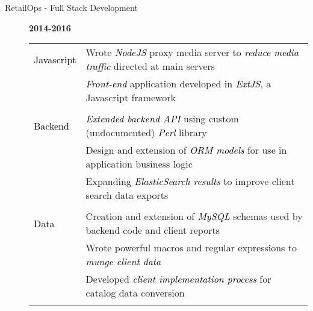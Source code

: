 \documentclass[12pt]{article}
\begin{document}
\begin{description}
\begin{description}
                \item[RetailOps - Full Stack Development] \hfill \textbf{2014-2016}\\
		\textcolor{gray}{
                    \begin{tabular}{l|l}
				\\[-1.0mm]
                        \textcolor{black}{Javascript} & Wrote \textcolor{black}{\textit{NodeJS}} proxy media server to \textcolor{black}{\textit{reduce media traffic}} directed at main servers \\
				   & \textcolor{black}{\textit{Front-end}} application developed in \textcolor{black}{\textit{ExtJS}}, a Javascript framework\\
				\\[-1.7mm]
                        \textcolor{black}{Backend}    & \textcolor{black}{\textit{Extended backend API}} using custom (undocumented) \textcolor{black}{\textit{Perl}} library\\
                                   & Design and extension of \textcolor{black}{\textit{ORM models}} for use in application business logic \\
                                   & Expanding \textcolor{black}{\textit{ElasticSearch results}} to improve client search data exports\\
				\\[-1.7mm]
                        \textcolor{black}{Data}       & Creation and extension of \textcolor{black}{\textit{MySQL}} schemas used by backend code and client reports\\
				   & Wrote powerful macros and regular expressions to \textcolor{black}{\textit{munge client data}}\\
				   & Developed \textcolor{black}{\textit{client implementation process}} for catalog data conversion\\
				\\[-1.0mm]
                    \end{tabular}
		}
            \end{description}


\end{description}
\end{document}
